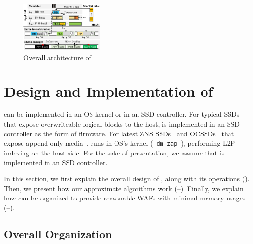 \begin{figure}[t]
\centering
\includegraphics[width=0.37\textwidth]{figs/OSDI/koo/overall.eps}
\caption{Overall architecture of \ours{}}
\label{fig:overall}
\end{figure}

\section{Design and Implementation of \ours{}} 
\label{sec:new-design}
\ours{} can be implemented in an OS kernel or in an SSD controller.
For typical SSDs that expose overwriteable logical blocks to the
host, \ours{} is implemented in an SSD controller as the form of firmware.
For latest ZNS SSDs~\cite{zns-ssd} and OCSSDs~\cite{ocssd} that expose
append-only media~\cite{dm-zoned}, \ours{} runs in OS's kernel
(\eg~\texttt{dm-zap}~\cite{dm-zap}), performing L2P indexing on the host
side.  For the sake of presentation, we assume that \ours{} is implemented in
an SSD controller.

In this section, we first explain the overall design of \ours{}, along with its
operations (). Then, we present how our approximate
algorithms work (--).
Finally, we explain how \ours{} can be organized to provide reasonable WAFs
with minimal memory usages (--).


\subsection{Overall Organization} 
\label{design:overall}

